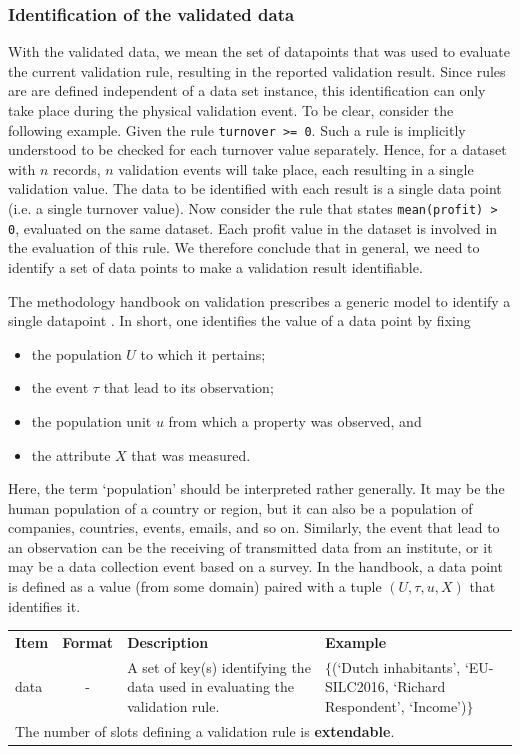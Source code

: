 \documentclass[a4paper, 11pt,titlepage]{article}
\newcommand{\code}[1]{\texttt{#1}}
\begin{document}
\subsubsection{Identification of the validated data}
\label{sect:iddata}
With the validated data, we mean the set of datapoints that was used to
evaluate the current validation rule, resulting in the reported validation
result. Since rules are are defined independent of a data set instance, this
identification can only take place during the physical validation event. To be
clear, consider the following example. Given the rule \code{turnover >= 0}.
Such a rule is implicitly understood to be checked for each turnover value
separately. Hence, for a dataset with $n$ records, $n$ validation events will
take place, each resulting in a single validation value. The data to be
identified with each result is a single data point (i.e. a single turnover
value). Now consider the rule that states \code{mean(profit) > 0}, evaluated on
the same dataset. Each profit value in the dataset is involved in the
evaluation of this rule. We therefore conclude that in general, we need to
identify a set of data points to make a validation result identifiable.


The methodology handbook on validation prescribes a generic model to 
identify a single datapoint \citep[Chapter~5]{zio2015methodology}. In short,
one identifies the value of a data point by fixing
\begin{itemize}
\item the population $U$ to which it pertains;
\item the event $\tau$ that lead to its observation;
\item the population unit $u$ from which a property was observed, and
\item the attribute $X$ that was measured.
\end{itemize}
Here, the term `population' should be interpreted rather generally. It may be
the human population of a country or region, but it can also be a population of
companies, countries, events, emails, and so on. Similarly, the event that lead
to an observation can be the receiving of transmitted data from an institute,
or it may be a data collection event based on a survey.  In the handbook, a
data point is defined as a value (from some domain) paired with a tuple
$(U,\tau,u,X)$ that identifies it.




\begin{center}
\begin{tabular}{|lp{15mm}p{}p{}|}
\hline
\textbf{Item} & \textbf{Format} & \textbf{Description} &\textbf{Example}\\
data    &\multicolumn{1}{c}{-} & A set of key(s) 
identifying the data used in evaluating the validation rule.
&  $\{$(`Dutch inhabitants', `EU-SILC2016, `Richard Respondent', `Income')$\}$\\
\hline
\multicolumn{4}{|l|}{The number of slots defining a validation rule is \textbf{extendable}.
}\\
\hline
\end{tabular}
\end{center}
\end{document}
